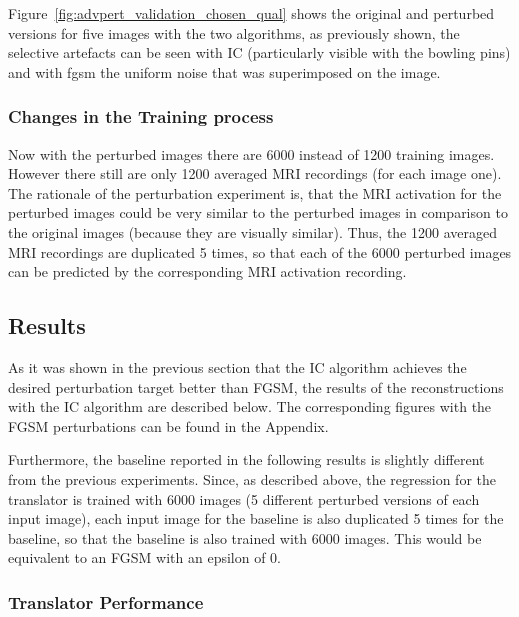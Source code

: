 Figure~\ref{fig:advpert_validation_chosen_qual} shows the original and perturbed versions for five images with the two algorithms, as previously shown, the selective artefacts can be seen with IC (particularly visible with the bowling pins) and with fgsm the uniform noise that was superimposed on the image. 

\subsubsection{Changes in the Training process}

Now with the perturbed images there are 6000 instead of 1200 training images. However there still are only 1200 averaged MRI recordings (for each image one). The rationale of the perturbation experiment is, that the MRI activation for the perturbed images could be very similar to the perturbed images in comparison to the original images (because they are visually similar). Thus, the 1200 averaged MRI recordings are duplicated 5 times, so that each of the 6000 perturbed images can be predicted by the corresponding MRI activation recording.


\subsection{Results}

As it was shown in the previous section that the IC algorithm achieves the desired perturbation target better than FGSM, the results of the reconstructions with the IC algorithm are described below. The corresponding figures with the FGSM perturbations can be found in the Appendix. 

Furthermore, the baseline reported in the following results is slightly different from the previous experiments. Since, as described above, the regression for the translator is trained with 6000 images (5 different perturbed versions of each input image), each input image for the baseline is also duplicated 5 times for the baseline, so that the baseline is also trained with 6000 images. This would be equivalent to an FGSM with an epsilon of 0. 

\subsubsection{Translator Performance}

